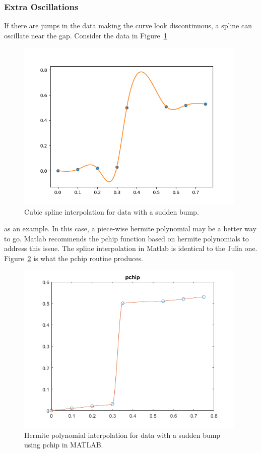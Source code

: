 \documentclass{scrartcl}
\begin{document}
\subsubsection{Extra Oscillations}
If there are jumps in the data making the curve look
discontinuous, a spline can oscillate near the gap.
Consider the data in Figure~\ref{fig:csbump}
\begin{figure}
\begin{center}
\includegraphics[width=11cm]{csbump}
\end{center}
\caption{\label{fig:csbump}Cubic spline interpolation for
data with a sudden bump.}
\end{figure}
as an example.
In this case, a piece-wise hermite polynomial
may be a better way to go. Matlab
recommends the pchip function\cite{Fritsch,Kahaner} based
on hermite polynomials to address this issue. The spline interpolation
in Matlab is identical to the Julia one. Figure~\ref{fig:pchip}
is what the pchip routine produces.
\begin{figure}
\begin{center}
\includegraphics[width=11cm]{pchip}
\end{center}
\caption{\label{fig:pchip}Hermite polynomial interpolation
for data with a sudden bump using pchip in MATLAB.}
\end{figure}
\end{document}
